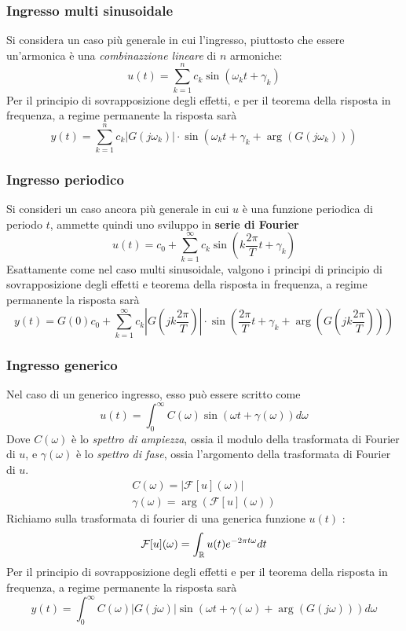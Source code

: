 \documentclass[10pt, letterpaper]{report}
\begin{document}
\subsubsection{Ingresso multi sinusoidale}
Si considera un caso più generale in cui l'ingresso, piuttosto che essere un'armonica è una \textit{combinazzione lineare} di $n$ armoniche:
$$ u(t)=\sum_{k=1}^nc_k\sin(\omega_kt+\gamma_k)$$
Per il principio di sovrapposizione degli effetti, e per il teorema della risposta in frequenza, a regime permanente la risposta sarà 
$$ y(t)=\sum_{k=1}^nc_k|G(j\omega_k)|\cdot \sin(\omega_kt+\gamma_k+\arg(G(j\omega_k)))$$
\subsubsection{Ingresso periodico}
Si consideri un caso ancora più generale in cui $u$ è una funzione periodica di periodo $t$, ammette quindi uno sviluppo in \textbf{serie di Fourier} 
$$ u(t)=c_0+\sum_{k=1}^{\infty}c_k\sin(k\frac{2\pi}{T}t+\gamma_k)$$
Esattamente come nel caso multi sinusoidale, valgono i principi di principio di sovrapposizione degli effetti e teorema della risposta in frequenza, a regime permanente la risposta sarà  
$$ y(t)=G(0)c_0+\sum_{k=1}^{\infty}c_k|G(jk\frac{2\pi}{T})|\cdot \sin(\frac{2\pi}{T}t+\gamma_k+\arg(G(jk\frac{2\pi}{T})))$$
\subsubsection{Ingresso generico}
Nel caso di un generico ingresso, esso può essere scritto come 
$$ u(t)=\int_0^\infty C(\omega)\sin(\omega t+\gamma(\omega))d\omega$$
Dove $C(\omega)$ è lo \textit{spettro di ampiezza}, ossia il modulo della trasformata di Fourier di $u$, e $\gamma(\omega)$ è lo \textit{spettro di fase}, ossia l'argomento della trasformata di Fourier di $u$.
$$ \begin{matrix}
    C(\omega)=|\mathcal{F}[u](\omega)| \\ 
    \gamma(\omega)=\arg(\mathcal{F}[u](\omega))
\end{matrix}$$
Richiamo sulla trasformata di fourier di una generica funzione $u(t)$ : 
$$\mathcal{F}[u](\omega)=\int_{{\mathbb R}}u(t)e^{-2\pi t \omega }dt $$
Per il principio di sovrapposizione degli effetti e per il teorema della risposta in frequenza,  a regime permanente la risposta sarà  
 $$
 y(t)=\int_0^\infty C(\omega)|G(j\omega)|\sin(\omega t+\gamma(\omega)+\arg(G(j\omega )))d\omega
 $$
 \flowerLine 
\end{document}
